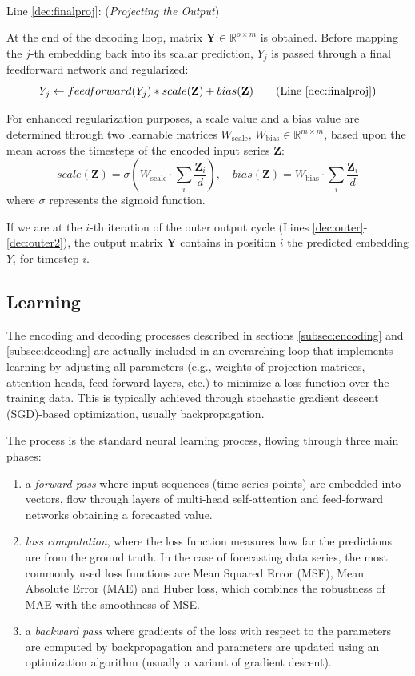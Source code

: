 \documentclass[algorithms,article,submit,pdftex,moreauthors]{Definitions/mdpi}
\begin{document}
~\\Line \ref{dec:finalproj}: (\textit{Projecting the Output})

\noindent At the end of the decoding loop, matrix $\textbf{Y} \in \mathbb{R}^{o \times m}$ is obtained.
Before mapping the $j$-th embedding back into its scalar prediction, $Y_j$ is passed through a final feedforward network and regularized:
\begin{equation}
    Y_j \leftarrow feedforward(Y_j) * scale(\textbf{Z}) + bias(\textbf{Z})
    \tag{Line \ref{dec:finalproj}}
\end{equation}

For enhanced regularization purposes, a scale value and a bias value are determined through two learnable matrices $W_\text{scale},\,W_\text{bias} \in \mathbb{R}^{m \times m}$, based upon the mean across the timesteps of the encoded input series $\textbf{Z}$:
$$
    scale(\textbf{Z}) = \sigma\left(W_\text{scale} \cdot \sum_{i} \dfrac{\textbf{Z}_i}{d}\right), \quad bias(\textbf{Z}) = W_\text{bias} \cdot \sum_{i} \dfrac{\textbf{Z}_i}{d}
$$
where $\sigma$ represents the sigmoid function.

If we are at the $i$-th iteration of the outer output cycle (Lines \ref{dec:outer}-\ref{dec:outer2}), the output matrix $\textbf{Y}$ contains in position $i$ the predicted embedding $Y_i$ for timestep $i$.

\subsection{Learning} \label{subsec:learning}

The encoding and decoding processes described in sections \ref{subsec:encoding} and \ref{subsec:decoding} are actually included in an overarching loop that implements learning by adjusting all parameters (e.g., weights of projection matrices, attention heads, feed-forward layers, etc.) to minimize a loss function over the training data. This is typically achieved through stochastic gradient descent (SGD)-based optimization, usually backpropagation.

The process is the standard neural learning process, flowing through three main phases:
\begin{enumerate}
    \item a {\it forward pass} where input sequences (time series points) are embedded into vectors, flow through layers of multi-head self-attention and feed-forward networks obtaining a forecasted value.

    \item {\it loss computation}, where the loss function measures how far the predictions are from the ground truth. In the case of forecasting data series, the most commonly used loss functions are Mean Squared Error (MSE), Mean Absolute Error (MAE) and Huber loss, which combines the robustness of MAE with the smoothness of MSE.

    \item a {\it backward pass} where gradients of the loss with respect to the parameters are computed by backpropagation and parameters are updated using an optimization algorithm (usually a variant of gradient descent).
\end{enumerate}
\end{document}
